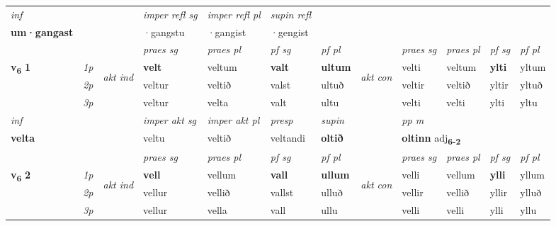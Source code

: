 \begin{longtable}[l]{X>{\footnotesize\itshape}llXXXXlXXXX}
   {\textit{inf}} & &   & \textit{imper refl sg} & \textit{imper refl pl}   & \textit{supin refl}  \\*
  {\textbf{um\allowbreak ·gangast}} & &   & ·gangstu & ·gangist   & ·gengist  \\*

\midrule

 & &   & \textit{praes sg}  & \textit{praes pl}    & \textit{ pf sg} & \textit{pf pl} & & \textit{praes sg}  & \textit{praes pl}    & \textit{pf sg} & \textit{pf pl }  \\ \cmidrule{4-7} \cmidrule{9-12}
 \multirow{2}{*}{{{\textbf{v{\textsubscript{6}}} \Large{\textbf{1}}}}}  & 1p & \multirow{3}{*}{\begin{turn}{90}\textit{akt ind}\end{turn}} & \textbf{velt} & veltum & \textbf{valt} & \textbf{ultum} & \multirow{3}{*}{\begin{turn}{90}\textit{akt con}\end{turn}} &velti & veltum & \textbf{ylti} & yltum\\*
 & 2p &  &  veltur  & veltið & valst & ultuð & & veltir & veltið & yltir & yltuð \\*
 & 3p &  & veltur & velta & valt & ultu & & velti & velti& ylti & yltu \\*
\cmidrule{4-7} \cmidrule{9-12}

   {\textit{inf}} & &  & \textit{imper akt sg} & \textit{imper akt pl}   & \textit{presp} & \textit{supin}  && \textit{pp m} \\*
  {\textbf{velta}} & && veltu  & veltið   & veltandi &  \textbf{oltið}  && \multicolumn{2}{l}{\textbf{oltinn} adj\textbf{\textsubscript{6-2}}} \\*

\midrule

 & &   & \textit{praes sg}  & \textit{praes pl}    & \textit{ pf sg} & \textit{pf pl} & & \textit{praes sg}  & \textit{praes pl}    & \textit{pf sg} & \textit{pf pl }  \\ \cmidrule{4-7} \cmidrule{9-12}
 \multirow{2}{*}{{{\textbf{v{\textsubscript{6}}} \Large{\textbf{2}}}}}  & 1p & \multirow{3}{*}{\begin{turn}{90}\textit{akt ind}\end{turn}} & \textbf{vell} & vellum & \textbf{vall} & \textbf{ullum} & \multirow{3}{*}{\begin{turn}{90}\textit{akt con}\end{turn}} &velli & vellum & \textbf{ylli} & yllum\\*
 & 2p &  &  vellur  & vellið & vallst & ulluð & & vellir & vellið & yllir & ylluð \\*
 & 3p &  & vellur & vella & vall & ullu & & velli & velli& ylli & yllu \\*
\cmidrule{4-7} \cmidrule{9-12}


\end{longtable}
